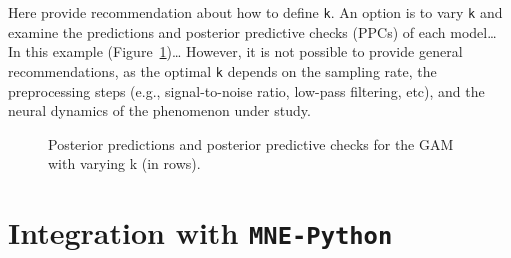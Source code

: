 \documentclass[
  doc,
  floatsintext,
  longtable,
  a4paper,
  nolmodern,
  notxfonts,
  notimes,
  colorlinks=true,linkcolor=blue,citecolor=blue,urlcolor=blue]{apa7}
\begin{document}
Here provide recommendation about how to define \texttt{k}. An option is
to vary \texttt{k} and examine the predictions and posterior predictive
checks (PPCs) of each model\ldots{} In this example
(Figure~\ref{fig-choose-k})\ldots{} However, it is not possible to
provide general recommendations, as the optimal \texttt{k} depends on
the sampling rate, the preprocessing steps (e.g., signal-to-noise ratio,
low-pass filtering, etc), and the neural dynamics of the phenomenon
under study.

\begin{figure}[!htb]

\caption{\label{fig-choose-k}Posterior predictions and posterior
predictive checks for the GAM with varying k (in rows).}


\end{figure}%

\newpage

\section{\texorpdfstring{Integration with
\texttt{MNE-Python}}{Integration with MNE-Python}}\label{integration-with-mne-python}
\end{document}

